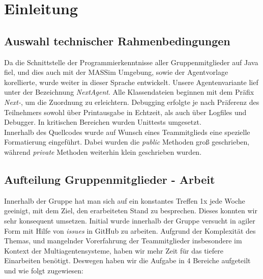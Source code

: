 \section{Einleitung}

\subsection{Auswahl technischer Rahmenbedingungen}

Da die Schnittstelle der Programmierkenntnisse aller Gruppenmitglieder auf Java fiel, und dies auch mit der MASSim Umgebung, sowie der Agentvorlage korellierte, wurde weiter in dieser Sprache entwickelt. Unsere Agentenvariante lief unter der Bezeichnung \textit{NextAgent}.  Alle Klassendateien beginnen mit dem Präfix \textit{Next-}, um die Zuordnung zu erleichtern. Debugging erfolgte je nach Präferenz des Teilnehmers sowohl über Printausgabe in Echtzeit, als auch über Logfiles und Debugger. In kritischen Bereichen wurden Unittests umgesetzt. \\

Innerhalb des Quellcodes wurde auf Wunsch eines Teammitglieds eine spezielle Formatierung eingeführt. Dabei wurden die \textit{public} Methoden groß geschrieben, während \textit{private} Methoden weiterhin klein geschrieben wurden.

\subsection{Aufteilung Gruppenmitglieder - Arbeit}

Innerhalb der Gruppe hat man sich auf ein konstantes Treffen 1x jede Woche geeinigt, mit dem Ziel, den erarbeiteten Stand zu besprechen. Dieses konnten wir sehr konsequent umsetzen. Initial wurde innerhalb der Gruppe versucht in agiler Form mit Hilfe von \textit{issues} in GitHub zu arbeiten. Aufgrund der Komplexität des Themas, und mangelnder Vorerfahrung der Teammitglieder insbesondere im Kontext der Multiagentensysteme, haben wir mehr Zeit für das tiefere Einarbeiten benötigt. Deswegen haben wir die Aufgabe in 4 Bereiche aufgeteilt und wie folgt zugewiesen:

